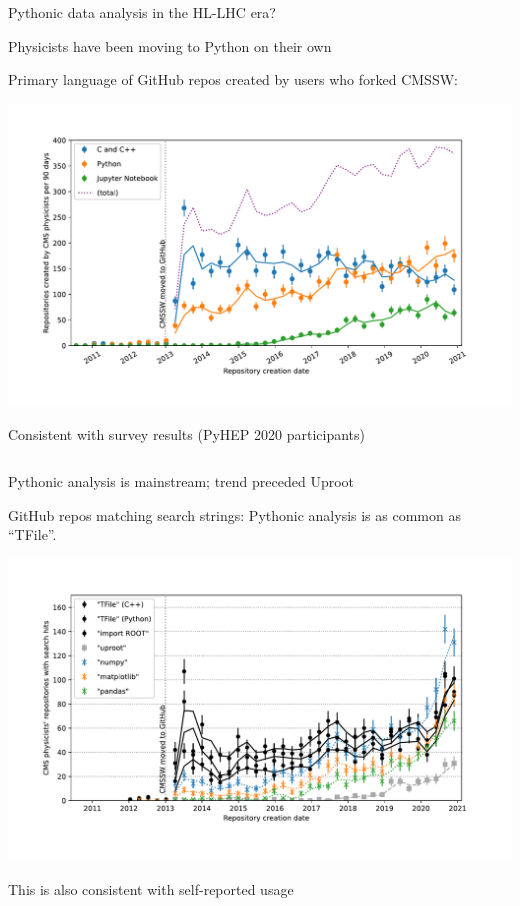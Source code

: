\documentclass[aspectratio=169]{beamer}
\begin{document}
\begin{frame}{Pythonic data analysis in the HL-LHC era?}
\vspace{0.25 cm}
\begin{center}
\end{center}
\end{frame}

\begin{frame}{Physicists have been moving to Python on their own}
\vspace{0.35 cm}

Primary language of GitHub repos created by users who forked CMSSW:

\vspace{-0.6 cm}
\includegraphics[width=\linewidth]{lhlhc-github-languages.pdf}
\end{frame}

\begin{frame}{Consistent with survey results (PyHEP 2020 participants)}
\vspace{0.2 cm}
\begin{columns}
\end{columns}
\end{frame}

\begin{frame}{Pythonic analysis is mainstream; trend preceded Uproot}
\vspace{0.35 cm}

GitHub repos matching search strings: Pythonic analysis is as common as ``TFile''.

\vspace{-0.6 cm}
\includegraphics[width=\linewidth]{lhlhc-github-overlay-lin.pdf}
\end{frame}

\begin{frame}{This is also consistent with self-reported usage}
\vspace{-0.35 cm}
\begin{columns}
\column{1.1\linewidth
\end{columns}
\end{frame}
\end{document}
